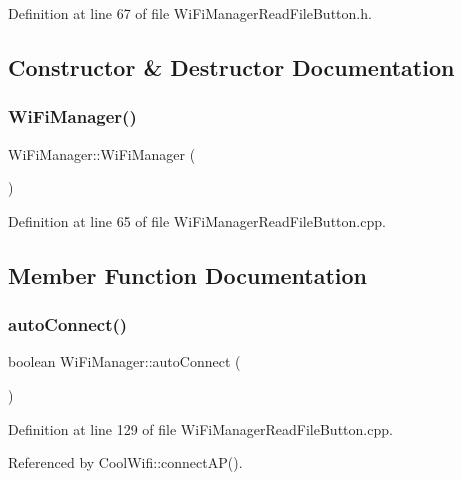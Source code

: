 Definition at line 67 of file Wi\+Fi\+Manager\+Read\+File\+Button.\+h.



\subsection{Constructor \& Destructor Documentation}
\mbox{\label{class_wi_fi_manager_a7d2efc3a8d43169ad058fc1fe797e106}} 
\subsubsection{\texorpdfstring{Wi\+Fi\+Manager()}{WiFiManager()}}
{\footnotesize\ttfamily Wi\+Fi\+Manager\+::\+Wi\+Fi\+Manager (\begin{DoxyParamCaption}{ }\end{DoxyParamCaption})}



Definition at line 65 of file Wi\+Fi\+Manager\+Read\+File\+Button.\+cpp.



\subsection{Member Function Documentation}
\mbox{\label{class_wi_fi_manager_ae3cdfa6b02edcfe63d7da4f696b62136}} 
\subsubsection{\texorpdfstring{auto\+Connect()}{autoConnect()}\hspace{0.1cm}{\footnotesize\ttfamily [1/2]}}
{\footnotesize\ttfamily boolean Wi\+Fi\+Manager\+::auto\+Connect (\begin{DoxyParamCaption}{ }\end{DoxyParamCaption})}



Definition at line 129 of file Wi\+Fi\+Manager\+Read\+File\+Button.\+cpp.



Referenced by Cool\+Wifi\+::connect\+A\+P().

